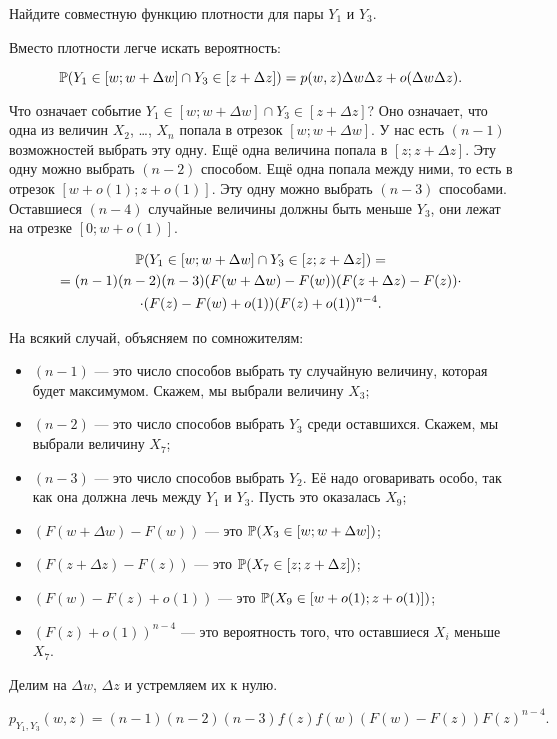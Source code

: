 \begin{myex}
Найдите совместную функцию плотности для пары  $ Y_{1} $ и $ Y_{3} $.

Вместо плотности легче искать вероятность:

\begin{equation}
 \P(Y_{1}\in [w;w+\Delta w] \cap Y_{3} \in [z+\Delta z] )=p(w,z)\Delta w\Delta z+o(\Delta w \Delta z).
\end{equation}


Что означает событие $ Y_{1} \in [w;w+\Delta w] \cap Y_{3} \in [z+\Delta z]$? Оно означает, что одна из величин $ X_{2} $, \ldots, $ X_{n} $ попала в отрезок $ [w;w+\Delta w] $. У нас есть $ (n-1) $ возможностей выбрать эту одну. Ещё одна величина попала в $ [z;z+\Delta z] $. Эту одну можно выбрать $ (n-2) $ способом. Ещё одна попала между ними, то есть в отрезок $ [w+o(1);z+o(1)] $. Эту одну можно выбрать $(n-3)$ способами. Оставшиеся $ (n-4) $ случайные величины должны быть меньше $ Y_{3} $, они лежат на отрезке $ [0;w+o(1)] $.

\begin{multline}
\P(Y_{1}\in [w;w+\Delta w] \cap Y_{3}\in [z;z+\Delta z] ) =\\
= (n-1)(n-2)(n-3) (F(w+\Delta w)-F(w)) (F(z+\Delta z)-F(z))\cdot \\
\cdot (F(z)-F(w)+o(1)) (F(z)+o(1))^{n-4}.
\end{multline}

На всякий случай, объясняем по сомножителям:
\begin{itemize}
\item $(n-1)  $ — это число способов выбрать ту случайную величину, которая будет максимумом. Скажем, мы выбрали величину $ X_{3} $;
\item $ (n-2) $ — это число способов выбрать $ Y_{3} $ среди оставшихся. Скажем, мы выбрали величину $ X_{7} $;
\item $ (n-3) $ — это число способов выбрать $ Y_{2} $. Её надо оговаривать особо, так как она должна лечь между $ Y_{1} $ и $ Y_{3} $. Пусть это оказалась $ X_{9} $;
\item $(F(w+\Delta w)-F(w))$ — это $ \P(X_{3}\in [w;w+\Delta w]) $;
\item $(F(z+\Delta z)-F(z))$ — это $ \P(X_{7}\in [z;z+\Delta z] ) $;
\item $(F(w)-F(z)+o(1))$ — это $ \P(X_{9}\in [w+o(1);z+o(1)] ) $;
\item $ (F(z)+o(1))^{n-4} $ — это вероятность того, что оставшиеся $ X_{i} $ меньше $ X_{7} $.
\end{itemize}

Делим на $ \Delta w $, $ \Delta z $ и устремляем их к нулю.

\begin{equation}
p_{Y_{1},Y_{3}}(w,z)=(n-1)(n-2)(n-3)f(z)f(w)(F(w)-F(z))F(z)^{n-4}.
\end{equation}

\end{myex}



